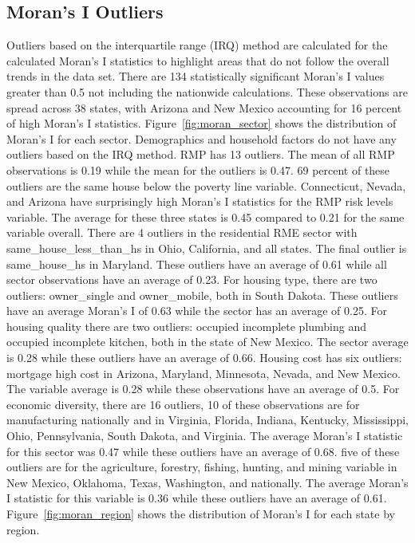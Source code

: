 \subsection{Moran's I Outliers}
Outliers based on the interquartile range (IRQ) method are calculated for the calculated Moran's I statistics to highlight areas that do not follow the overall trends in the data set. There are 134 statistically significant Moran's I values greater than 0.5 not including the nationwide calculations. These observations are spread across 38 states, with Arizona and New Mexico accounting for 16 percent of high Moran's I statistics. Figure~\ref{fig:moran_sector} shows the distribution of Moran's I for each sector. Demographics and household factors do not have any outliers based on the IRQ method. RMP has 13 outliers. The mean of all RMP observations is 0.19 while the mean for the outliers is 0.47. 69 percent of these outliers are the same house below the poverty line variable. Connecticut, Nevada, and Arizona have surprisingly high Moran’s I statistics for the RMP risk levels variable. The average for these three states is 0.45 compared to 0.21 for the same variable overall. There are 4 outliers in the residential RME sector with same\_house\_less\_than\_hs in Ohio, California, and all states. The final outlier is same\_house\_hs in Maryland. These outliers have an average of 0.61 while all sector observations have an average of 0.23. For housing type, there are two outliers: owner\_single and owner\_mobile, both in South Dakota. These outliers have an average Moran’s I of 0.63 while the sector has an average of 0.25. For housing quality there are two outliers: occupied incomplete plumbing and occupied incomplete kitchen, both in the state of New Mexico. The sector average is 0.28 while these outliers have an average of 0.66. Housing cost has six outliers: mortgage high cost in Arizona, Maryland, Minnesota, Nevada, and New Mexico. The variable average is 0.28 while these observations have an average of 0.5. For economic diversity, there are 16 outliers, 10 of these observations are for manufacturing nationally and in Virginia, Florida, Indiana, Kentucky, Mississippi, Ohio, Pennsylvania, South Dakota, and Virginia. The average Moran’s I statistic for this sector was 0.47 while these outliers have an average of 0.68. five of these outliers are for the agriculture, forestry, fishing, hunting, and mining variable in New Mexico, Oklahoma, Texas, Washington, and nationally. The average Moran’s I statistic for this variable is 0.36 while these outliers have an average of 0.61. Figure~\ref{fig:moran_region} shows the distribution of Moran's I for each state by region.

